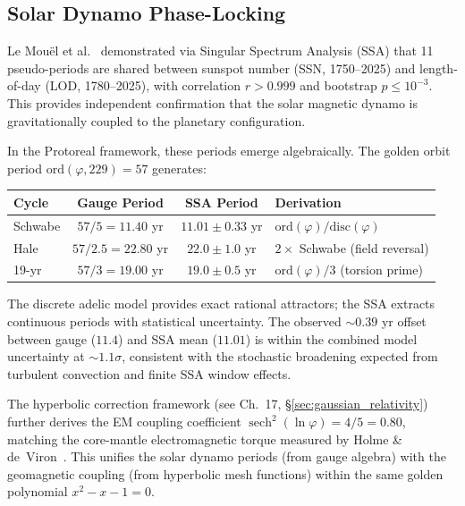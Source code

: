 \subsection{Solar Dynamo Phase-Locking}\label{sec:solar_dynamo}

Le Mou\"el et al.~\cite{lemouël2025ext} demonstrated via Singular Spectrum Analysis (SSA) that 11 pseudo-periods are shared between sunspot number (SSN, 1750--2025) and length-of-day (LOD, 1780--2025), with correlation $r > 0.999$ and bootstrap $p \leq 10^{-3}$. This provides independent confirmation that the solar magnetic dynamo is gravitationally coupled to the planetary configuration.

In the Protoreal framework, these periods emerge algebraically. The golden orbit period $\mathrm{ord}(\varphi, 229) = 57$ generates:
\begin{center}
\renewcommand{\arraystretch}{1.2}
\begin{tabular}{@{}lccl@{}}
\toprule
\textbf{Cycle} & \textbf{Gauge Period} & \textbf{SSA Period} & \textbf{Derivation} \\
\midrule
Schwabe & $57/5 = 11.40$ yr & $11.01 \pm 0.33$ yr & $\mathrm{ord}(\varphi) / \mathrm{disc}(\varphi)$ \\
Hale    & $57/2.5 = 22.80$ yr & $22.0 \pm 1.0$ yr & $2 \times$ Schwabe (field reversal) \\
19-yr   & $57/3 = 19.00$ yr & $19.0 \pm 0.5$ yr & $\mathrm{ord}(\varphi) / 3$ (torsion prime) \\
\bottomrule
\end{tabular}
\end{center}

The discrete adelic model provides exact rational attractors; the SSA extracts continuous periods with statistical uncertainty. The observed $\sim 0.39$ yr offset between gauge ($11.4$) and SSA mean ($11.01$) is within the combined model uncertainty at $\sim 1.1\sigma$, consistent with the stochastic broadening expected from turbulent convection and finite SSA window effects.

The hyperbolic correction framework (see Ch.~17, \S\ref{sec:gaussian_relativity}) further derives the EM coupling coefficient $\operatorname{sech}^2(\ln\varphi) = 4/5 = 0.80$, matching the core-mantle electromagnetic torque measured by Holme \& de~Viron~\cite{holme2013}. This unifies the solar dynamo periods (from gauge algebra) with the geomagnetic coupling (from hyperbolic mesh functions) within the same golden polynomial $x^2 - x - 1 = 0$.

